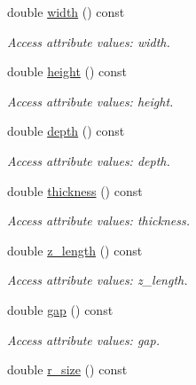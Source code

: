 \begin{DoxyCompactItemize}
double \hyperlink{struct_d_d4hep_1_1_x_m_l_1_1_dimension_a908be6938052db121d089b619675e4d4}{width} () const 
\begin{DoxyCompactList}\small\item\em Access attribute values: width. \item\end{DoxyCompactList}\item 
double \hyperlink{struct_d_d4hep_1_1_x_m_l_1_1_dimension_ad8f940506be33fb90b4280535e7b6129}{height} () const 
\begin{DoxyCompactList}\small\item\em Access attribute values: height. \item\end{DoxyCompactList}\item 
double \hyperlink{struct_d_d4hep_1_1_x_m_l_1_1_dimension_ab0a01a737c6ab027c8d5feab51b356fb}{depth} () const 
\begin{DoxyCompactList}\small\item\em Access attribute values: depth. \item\end{DoxyCompactList}\item 
double \hyperlink{struct_d_d4hep_1_1_x_m_l_1_1_dimension_a3ef8d9614fde0917ebb5050b19515db0}{thickness} () const 
\begin{DoxyCompactList}\small\item\em Access attribute values: thickness. \item\end{DoxyCompactList}\item 
double \hyperlink{struct_d_d4hep_1_1_x_m_l_1_1_dimension_aacea30f3ffad4eb1de608e953abf3769}{z\_\-length} () const 
\begin{DoxyCompactList}\small\item\em Access attribute values: z\_\-length. \item\end{DoxyCompactList}\item 
double \hyperlink{struct_d_d4hep_1_1_x_m_l_1_1_dimension_a5eb298d2815783f68d0ee3e1dfa34d0f}{gap} () const 
\begin{DoxyCompactList}\small\item\em Access attribute values: gap. \item\end{DoxyCompactList}\item 
double \hyperlink{struct_d_d4hep_1_1_x_m_l_1_1_dimension_a13c400128523f39dbacfd94ff09395bd}{r\_\-size} () const 

\end{DoxyCompactItemize}
